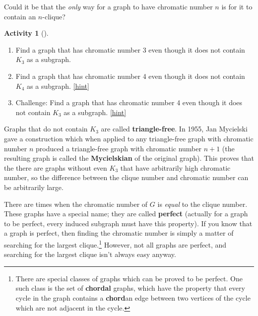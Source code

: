 \documentclass[10pt,]{book}
\newcommand{\terminology}[1]{\textbf{#1}}
\theoremstyle{plain}
\theoremstyle{definition}
\theoremstyle{definition}
\theoremstyle{definition}
\newtheorem{activity}[project]{Activity}
\numberwithin{equation}{chapter}
\begin{document}
\hypertarget{p-376}{}%
Could it be that the \emph{only} way for a graph to have chromatic number \(n\) is for it to contain an \(n\)-clique?%
\begin{activity}[]\label{activity-36}
\leavevmode%
\begin{enumerate}[font=\bfseries,label=(\alph*),ref=\alph*]
\item\label{task-55} \hypertarget{p-377}{}%
Find a graph that has chromatic number 3 even though it does not contain \(K_3\) as a subgraph.%
\item\label{task-56} \hypertarget{p-378}{}%
Find a graph that has chromatic number 4 even though it does not contain \(K_4\) as a subgraph.%
\hfill{\tiny\hyperlink{a-43.b}{[hint]}\hypertarget{q-43.b}{}}\item\label{task-57} \hypertarget{p-380}{}%
Challenge: Find a graph that has chromatic number 4 even though it does not contain \(K_3\) as a subgraph.%
\hfill{\tiny\hyperlink{a-43.c}{[hint]}\hypertarget{q-43.c}{}}\end{enumerate}
\end{activity}
\hypertarget{p-382}{}%
Graphs that do not contain \(K_3\) are called \terminology{triangle-free}.  In 1955, Jan Mycielski gave a construction which when applied to any triangle-free graph with chromatic number \(n\) produced a triangle-free graph with chromatic number \(n+1\) (the resulting graph is called the \terminology{Mycielskian} of the original graph).  This proves that the there are graphs without even \(K_3\) that have arbitrarily high chromatic number, so the difference between the clique number and chromatic number can be arbitrarily large.%
\par
\hypertarget{p-383}{}%
There are times when the chromatic number of \(G\) is \emph{equal} to the clique number. These graphs have a special name; they are called \terminology{perfect} (actually for a graph to be perfect, every induced subgraph must have this property). If you know that a graph is perfect, then finding the chromatic number is simply a matter of searching for the largest clique.\footnote{There are special classes of graphs which can be proved to be perfect.  One such class is the set of \terminology{chordal} graphs, which have the property that every cycle in the graph contains a \terminology{chord}\textemdash{}an edge between two vertices of the cycle which are not adjacent in the cycle.\label{fn-5}} However, not all graphs are perfect, and searching for the largest clique isn't always easy anyway.%
\par
\end{document}
